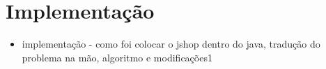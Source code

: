 
\chapter{\label{chap:impl}Implementação}

\begin{itemize}
	\item implementação - como foi colocar o jshop dentro do java, tradução do problema na mão, algoritmo e modificações1
\end{itemize}
